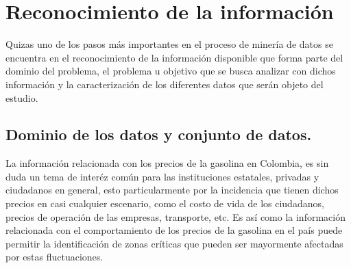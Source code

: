 \section{Reconocimiento de la información}
Quizas uno de los pasos más importantes  en el proceso de minería de datos se encuentra en el reconocimiento de la información disponible que forma parte del dominio del problema, el problema u objetivo que se busca analizar con dichos información y la caracterización de los diferentes datos que serán objeto del estudio.

 \subsection{Dominio de los datos y conjunto de datos.}
 La información relacionada con los precios de la gasolina en Colombia, es sin duda un tema de interéz común para las instituciones estatales, privadas y ciudadanos en general, esto particularmente por la incidencia que tienen dichos precios en casi cualquier escenario, como el costo de vida de los ciudadanos, precios de operación de las empresas, transporte, etc. Es así como la información relacionada con el comportamiento de los precios de la gasolina en el país puede permitir la identificación de zonas críticas que pueden ser mayormente afectadas por estas fluctuaciones.

